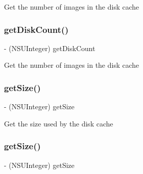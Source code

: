 Get the number of images in the disk cache \mbox{\label{interface_s_d_image_cache_abc59ee03f3afc7d9fa202a0790f8b5c0}} 
\subsubsection{\texorpdfstring{get\+Disk\+Count()}{getDiskCount()}\hspace{0.1cm}{\footnotesize\ttfamily [3/3]}}
{\footnotesize\ttfamily -\/ (N\+S\+U\+Integer) get\+Disk\+Count \begin{DoxyParamCaption}{ }\end{DoxyParamCaption}}

Get the number of images in the disk cache \mbox{\label{interface_s_d_image_cache_a934d85543e92fdb3ac35cbdff3e668d3}} 
\subsubsection{\texorpdfstring{get\+Size()}{getSize()}\hspace{0.1cm}{\footnotesize\ttfamily [1/3]}}
{\footnotesize\ttfamily -\/ (N\+S\+U\+Integer) get\+Size \begin{DoxyParamCaption}{ }\end{DoxyParamCaption}}

Get the size used by the disk cache \mbox{\label{interface_s_d_image_cache_a934d85543e92fdb3ac35cbdff3e668d3}} 
\subsubsection{\texorpdfstring{get\+Size()}{getSize()}\hspace{0.1cm}{\footnotesize\ttfamily [2/3]}}
{\footnotesize\ttfamily -\/ (N\+S\+U\+Integer) get\+Size \begin{DoxyParamCaption}{ }\end{DoxyParamCaption}}

